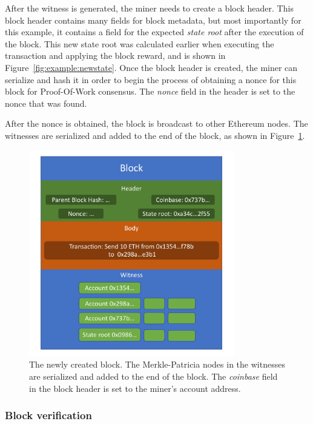 \documentclass[12pt]{article}
\begin{document}
After the witness is generated, the miner needs to create a block header. This block header contains many fields for block metadata, but most importantly for this example, it contains a field for the expected \emph{state root} after the execution of the block. This new state root was calculated earlier when executing the transaction and applying the block reward, and is shown in Figure~\ref{fig:example:newstate}. Once the block header is created, the miner can serialize and hash it in order to begin the process of obtaining a nonce for this block for Proof-Of-Work consensus. The \emph{nonce} field in the header is set to the nonce that was found.

After the nonce is obtained, the block is broadcast to other Ethereum nodes. The witnesses are serialized and added to the end of the block, as shown in Figure~\ref{fig:example:block}.

\begin{figure}[H]
  \centering
  \includegraphics[width=0.8\textwidth]{../figures/design/example_block.pdf}
  \caption{The newly created block. The Merkle-Patricia nodes in the witnesses are serialized and added to the end of the block. The \emph{coinbase} field in the block header is set to the miner's account address.}
  \label{fig:example:block}
\end{figure}

\subsubsection{Block verification}
\end{document}
